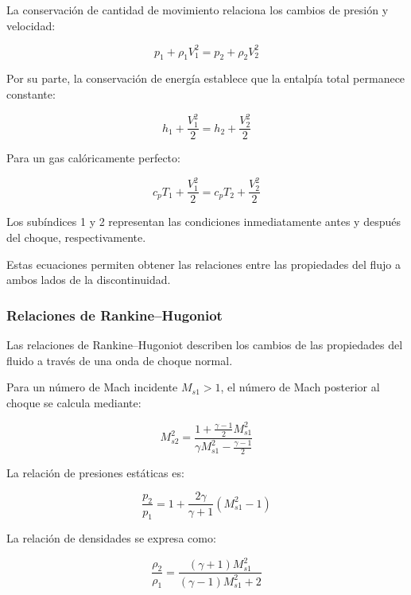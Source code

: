 \documentclass[12pt,letterpaper]{article}
\numberwithin{equation}{section}
\begin{document}
La conservación de cantidad de movimiento
relaciona los cambios de presión y velocidad:

\begin{equation}
    p_1+\rho_1 V_1^2
    =p_2+\rho_2 V_2^2
\end{equation}

Por su parte, la conservación de energía
establece que la entalpía total permanece
constante:

\begin{equation}
    h_1+\frac{V_1^2}{2}
    =h_2+\frac{V_2^2}{2}
\end{equation}

Para un gas calóricamente perfecto:

\begin{equation}
    c_pT_1+\frac{V_1^2}{2}
    =c_pT_2+\frac{V_2^2}{2}
\end{equation}

Los subíndices 1 y 2 representan las
condiciones inmediatamente antes y después
del choque, respectivamente.

Estas ecuaciones permiten obtener las
relaciones entre las propiedades del
flujo a ambos lados de la discontinuidad.


\subsubsection{Relaciones de Rankine--Hugoniot}

Las relaciones de Rankine--Hugoniot describen
los cambios de las propiedades del fluido
a través de una onda de choque normal.

Para un número de Mach incidente
$M_{s1}>1$, el número de Mach posterior
al choque se calcula mediante:

\begin{equation}
    M_{s2}^2=
    \frac{
    1+\frac{\gamma-1}{2}M_{s1}^2
    }{
    \gamma M_{s1}^2-\frac{\gamma-1}{2}
    }
\end{equation}

La relación de presiones estáticas es:

\begin{equation}
    \frac{p_2}{p_1}
    =1+\frac{2\gamma}{\gamma+1}
    \left(M_{s1}^2-1\right)
\end{equation}

La relación de densidades se expresa como:

\begin{equation}
    \frac{\rho_2}{\rho_1}
    =\frac{(\gamma+1)M_{s1}^2}{
    (\gamma-1)M_{s1}^2+2}
\end{equation}
\end{document}
